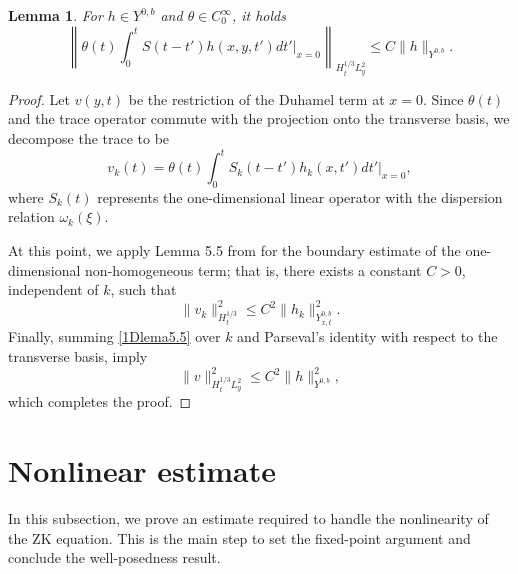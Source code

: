 \documentclass[11pt]{article}
\numberwithin{equation}{section}
\newtheorem{lemma}{Lemma}
\begin{document}
\begin{lemma}
For $h\in Y^{0,b}$ and $\theta \in C_{0}^{\infty}$, it holds
\begin{equation}
\left\|\theta(t)\int_{0}^{t} S(t-t')h(x,y,t')dt'\Big|_{x=0}\right\|_{H^{1/3}_{t}L^{2}_{y}}\leq C\|h\|_{Y^{0,b}}.
\end{equation}
\end{lemma}
\begin{proof}
Let $v(y,t)$ be the restriction of the Duhamel term at $x=0$. Since $\theta(t)$ and the trace operator commute with the projection onto the transverse basis, we decompose the trace to be
\begin{equation}
v_{k}(t) = \theta(t)\int_{0}^{t} S_{k}(t-t')h_{k}(x,t')dt'\Big|_{x=0},\end{equation}
where $S_{k}(t)$ represents the one-dimensional linear operator with the dispersion relation $\omega_{k}(\xi)$.

At this point, we apply Lemma 5.5 from \cite{CK} for the boundary estimate of the one-dimensional non-homogeneous term; that is, there exists a constant $C > 0$, independent of $k$, such that
\begin{equation}\label{1Dlema5.5}
\|v_{k}\|_{H^{1/3}_{t}}^{2} \leq C^{2} \|h_{k}\|_{Y^{0,b}_{x,t}}^{2}.\end{equation}
Finally, summing \eqref{1Dlema5.5} over $k$ and Parseval's identity with respect to the transverse basis, imply
\begin{equation}
\|v\|_{H^{1/3}_{t}L^{2}_{y}}^{2} \leq C^{2} \|h\|_{Y^{0,b}}^{2},
\end{equation}
which completes the proof.
\end{proof}










\section{Nonlinear estimate}

In this subsection, we prove an estimate required to handle the
nonlinearity of the ZK equation. This is the main step to set the
fixed-point argument and conclude the well-posedness result.
\end{document}
